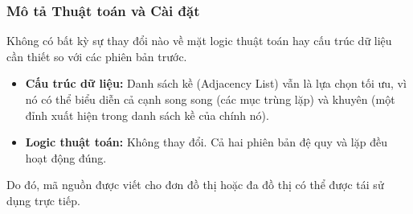 \documentclass[a4paper,12pt]{article}
\begin{document}
\subsubsection{Mô tả Thuật toán và Cài đặt}
Không có bất kỳ sự thay đổi nào về mặt logic thuật toán hay cấu trúc dữ liệu cần thiết so với các phiên bản trước.
\begin{itemize}
    \item \textbf{Cấu trúc dữ liệu:} Danh sách kề (Adjacency List) vẫn là lựa chọn tối ưu, vì nó có thể biểu diễn cả cạnh song song (các mục trùng lặp) và khuyên (một đỉnh xuất hiện trong danh sách kề của chính nó).
    \item \textbf{Logic thuật toán:} Không thay đổi. Cả hai phiên bản đệ quy và lặp đều hoạt động đúng.
\end{itemize}
Do đó, mã nguồn được viết cho đơn đồ thị hoặc đa đồ thị có thể được tái sử dụng trực tiếp.
\end{document}
